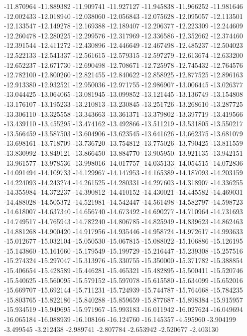 -11.870964
-11.889382
-11.909741
-11.927127
-11.945838
-11.966252
-11.981646
-12.002433
-12.018940
-12.038060
-12.056843
-12.075628
-12.095057
-12.113501
-12.133547
-12.149278
-12.169388
-12.189407
-12.206377
-12.223309
-12.244609
-12.260478
-12.280225
-12.299576
-12.317969
-12.336586
-12.352662
-12.374460
-12.391544
-12.411272
-12.430896
-12.446649
-12.467498
-12.485237
-12.504023
-12.522133
-12.541337
-12.561615
-12.579315
-12.597279
-12.613674
-12.633200
-12.652237
-12.671730
-12.690498
-12.708671
-12.725978
-12.745432
-12.764576
-12.782100
-12.800260
-12.821455
-12.840622
-12.858925
-12.877525
-12.896163
-12.913380
-12.932521
-12.950036
-12.971755
-12.986907
-13.006445
-13.026377
-13.044425
-13.064065
-13.081945
-13.099852
-13.121445
-13.136749
-13.154808
-13.176107
-13.195233
-13.210813
-13.230845
-13.251726
-13.268610
-13.287725
-13.306110
-13.325558
-13.343663
-13.361371
-13.379802
-13.397719
-13.419566
-13.439110
-13.455295
-13.474162
-13.492866
-13.511219
-13.531805
-13.550217
-13.566459
-13.587503
-13.604906
-13.623545
-13.641626
-13.662375
-13.681079
-13.698161
-13.718709
-13.736720
-13.754812
-13.775026
-13.790425
-13.811559
-13.830992
-13.849121
-13.866450
-13.884770
-13.905950
-13.921135
-13.942151
-13.961577
-13.978536
-13.998016
-14.017757
-14.035133
-14.054515
-14.072836
-14.091494
-14.109733
-14.129967
-14.147953
-14.165389
-14.187093
-14.203159
-14.224093
-14.243274
-14.261525
-14.280331
-14.297603
-14.318907
-14.336255
-14.355984
-14.372237
-14.390812
-14.410152
-14.430021
-14.445582
-14.469031
-14.488028
-14.505372
-14.521981
-14.542447
-14.561498
-14.582797
-14.598723
-14.618007
-14.637340
-14.656740
-14.673492
-14.690277
-14.710964
-14.731693
-14.749517
-14.765943
-14.782240
-14.806785
-14.825949
-14.839623
-14.862463
-14.881268
-14.900420
-14.917956
-14.935446
-14.958724
-14.972617
-14.993633
-15.012677
-15.032104
-15.050530
-15.067815
-15.088022
-15.106886
-15.126195
-15.143860
-15.161660
-15.179549
-15.199729
-15.216447
-15.239308
-15.257516
-15.274324
-15.297047
-15.313976
-15.330755
-15.350000
-15.371782
-15.388854
-15.406654
-15.428589
-15.446281
-15.465321
-15.482895
-15.500411
-15.520746
-15.540625
-15.560095
-15.579152
-15.597078
-15.615580
-15.634099
-15.652016
-15.669707
-15.692144
-15.711231
-15.724939
-15.744787
-15.764668
-15.784235
-15.803765
-15.822186
-15.840288
-15.859659
-15.877687
-15.898384
-15.915957
-15.934519
-15.949695
-15.971967
-15.993183
-16.011942
-16.027624
-16.049694
-16.065184
-16.088939
-16.108166
-16.124760
-16.145357
-4.595960
-3.904199
-3.499545
-3.212438
-2.989741
-2.807784
-2.653942
-2.520677
-2.403130
